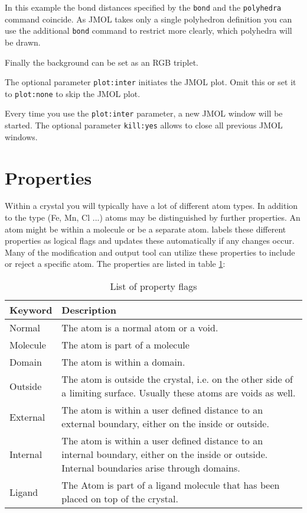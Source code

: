 In this example the bond distances specified by the {\tt bond} and the
{\tt polyhedra} command coincide. As JMOL takes only a single 
polyhedron definition you can use the additional {\tt bond} command to 
restrict more clearly, which polyhedra will be drawn.

Finally the background can be set as an RGB triplet.

The optional parameter {\tt plot:inter} initiates the JMOL plot. Omit this 
or set it to {\tt plot:none} to skip the JMOL plot. 

Every time you use the {\tt plot:inter} parameter, a new JMOL window 
will be started. The optional parameter {\tt kill:yes} allows to
close all previous JMOL windows.


\section{Properties \label{struc-properties}}

Within a crystal you will typically have a lot of different atom types. 
In addition to the type (Fe, Mn, Cl ...) atoms may be distinguished by
further properties. An atom might be within a molecule or be a separate
atom. \Discus labels these different properties as logical flags 
and updates these 
automatically if any changes occur. Many of the modification and output
tool can utilize these properties to include or reject a specific atom.
The properties are listed in table \ref{struc-prp-tab}:

\begin{table}[!tbh]
\centering
\begin{tabularx}{\textwidth}{|p{25mm}|X|}
  \hline
  {\bf Keyword} & {\bf Description} \\
  \hline\hline
  Normal      & The atom is a normal atom or a void.\\
  \hline
  Molecule    & The atom is part of a molecule \\
  \hline
  Domain      & The atom is within a domain. \\
  \hline
  Outside     & The atom is outside the crystal, i.e. on the other
                side of a limiting surface. Usually these atoms are
                voids as well.\\
  \hline
  External    & The atom is within a user defined distance to an 
                external boundary, either on the inside or outside.\\
  \hline
  Internal    & The atom is within a user defined distance to an 
                internal boundary, either on the inside or outside.
                Internal boundaries arise through domains.\\
  \hline
  Ligand      & The Atom is part of a ligand molecule that has been 
                placed on top of the crystal.\\
  \hline
\end{tabularx}
\caption{\label{struc-prp-tab} List of property flags}
\end{table}

